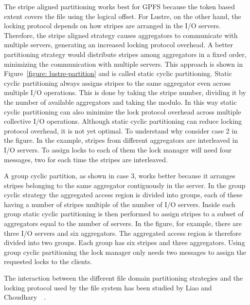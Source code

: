 The stripe aligned partitioning works best for GPFS because the token based extent covers the file using the logical offset. For Lustre, on the other hand, the locking protocol depends on how stripes are 
arranged in the I/O servers. Therefore, the stripe aligned strategy causes aggregators to communicate with multiple servers, generating an increased locking protocol overhead. A better partitioning strategy 
would distribute stripes among aggregators in a fixed order, minimizing the communication with multiple servers. This approach is shown in Figure~\ref{figure: lustre-partition} and is called static cyclic 
partitioning. Static cyclic partitioning always assigns stripes to the same aggregator even across multiple I/O operations. This is done by taking the stripe number, dividing it by the number of available 
aggregators and taking the modulo. In this way static cyclic partitioning can also minimize the lock protocol overhead across multiple collective I/O operations. Although static cyclic partitioning can 
reduce locking protocol overhead, it is not yet optimal. To understand why consider case 2 in the figure. In the example, stripes from different aggregators are interleaved in I/O servers. To assign locks 
to each of them the lock manager will need four messages, two for each time the stripes are interleaved. 

A group cyclic partition, as shown in case 3, works better because it arranges stripes belonging to the same aggregator contiguously in the server. In the group cyclic strategy the aggregated access
region is divided into groups, each of these having a number of stripes multiple of the number of I/O servers. Inside each group static cyclic partitioning is then performed to assign stripes to a subset 
of aggregators equal to the number of servers. In the figure, for example, there are three I/O servers and six aggregators. The aggregated access region is therefore divided into two groups. Each group has
six stripes and three aggregators. Using group cyclic partitioning the lock manager only needs two messages to assign the requested locks to the clients.

The interaction between the different file domain partitioning strategies and the locking protocol used by the file system has been studied by Liao and Choudhary~\cite{LiaoA08}~\cite{Liao11}.

